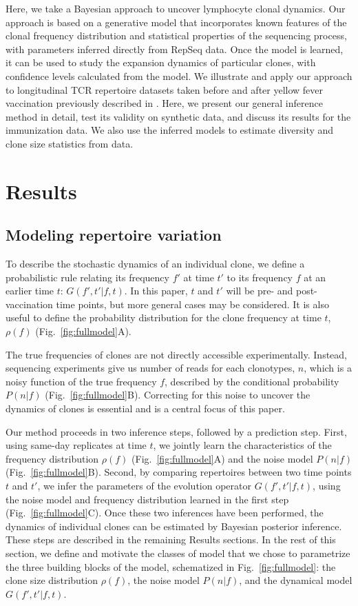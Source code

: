 \documentclass[pre,twocolumn,english,longbibliography]{revtex4}
\newcommand{\<}{\langle}
\renewcommand{\>}{\rangle}
\begin{document}
Here, we take a Bayesian approach to uncover lymphocyte clonal dynamics. Our approach is based on a generative model that incorporates known features of the clonal frequency distribution and statistical properties of the sequencing process, with parameters inferred directly from RepSeq data. Once the model is learned, it can be used to study the expansion dynamics of particular clones, with confidence levels calculated from the model. We illustrate and apply our approach to longitudinal TCR repertoire datasets taken before and after yellow fever vaccination previously described in \cite{Pogorelyy2018c}. Here, we present our general inference method in detail, test its validity on synthetic data, and discuss its results for the immunization data. We also use the inferred models to estimate diversity and clone size statistics from data. 


\section*{Results}

\subsection*{Modeling repertoire variation}

To describe the stochastic dynamics of an individual clone, we define a probabilistic rule relating its frequency $f'$ at time $t'$ to its frequency $f$ at an earlier time $t$: $G(f',t'|f,t)$. In this paper, $t$ and $t'$ will be pre- and post-vaccination time points, but more general cases may be considered.
It is also useful to define the probability distribution for the clone frequency at time $t$, $\rho(f)$ (Fig.~\ref{fig:fullmodel}A).

The true frequencies of clones are not directly accessible experimentally. Instead, sequencing experiments give us number of reads for each clonotypes, $n$, which is a noisy function of the true frequency $f$, described by the conditional probability $P(n|f)$ (Fig.~\ref{fig:fullmodel}B). Correcting for this noise to uncover the dynamics of clones is essential and is a central focus of this paper.

Our method proceeds in two inference steps, followed by a prediction step. First, using same-day replicates at time $t$, we jointly learn the characteristics of the frequency distribution $\rho(f)$  (Fig.~\ref{fig:fullmodel}A) and the noise model $P(n|f)$ (Fig.~\ref{fig:fullmodel}B). Second, by comparing repertoires between two time points $t$ and $t'$, we infer the parameters of the evolution operator $G(f',t'|f,t)$, using the noise model and frequency distribution learned in the first step (Fig.~\ref{fig:fullmodel}C). Once these two inferences have been performed, the dynamics of individual clones can be estimated by Bayesian posterior inference. These steps are described in the remaining Results sections. In the rest of this section, we define and motivate the classes of model that we chose to parametrize the three building blocks of the model, schematized in Fig.~\ref{fig:fullmodel}: the clone size distribution $\rho(f)$, the noise model $P(n|f)$, and the dynamical model $G(f',t'|f,t)$.
\end{document}
